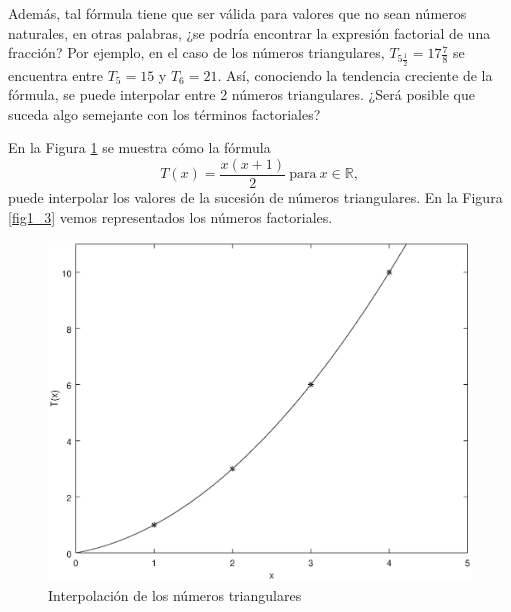 Además, tal fórmula tiene que ser válida para valores que no sean números naturales, en otras palabras, ¿se podría encontrar la expresión factorial de una fracción? Por ejemplo, en el caso de los números triangulares, $T_{5\frac{1}{2}} = 17\frac{7}{8}$ se encuentra entre $T_5 = 15$ y $T_6 = 21$. Así, conociendo la tendencia creciente de la fórmula, se puede interpolar entre 2 números triangulares. ¿Será posible que suceda algo semejante con los términos factoriales?

En la Figura \ref{fig1_2} se muestra cómo la fórmula 
\begin{equation}
	T(x) = \frac{x(x+1)}{2}\ \textrm{para}\ x\in\mathbb{R},
\end{equation}
puede interpolar los valores de la sucesión de números triangulares. En la Figura \ref{fig1_3} vemos representados los números factoriales.
\begin{figure}[htbp]
	\begin{center}
		\includegraphics[scale=0.5]{figura1_2.eps}
	\end{center}
\caption{Interpolación de los números triangulares}
\label{fig1_2}
\end{figure}
